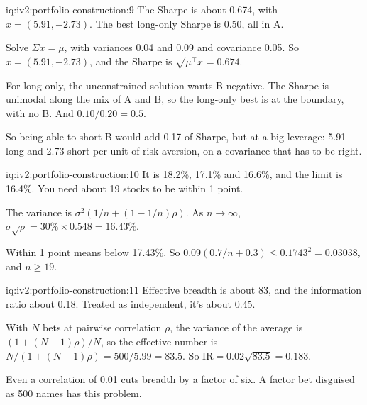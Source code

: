 \begin{solution}{iq:iv2:portfolio-construction:9}
The Sharpe is about 0.674, with $x = (5.91, -2.73)$. The best long-only Sharpe is 0.50, all in A.

Solve $\Sigma x = \mu$, with variances 0.04 and 0.09 and covariance 0.05. So $x = (5.91, -2.73)$, and the Sharpe is $\sqrt{\mu^\top x} = 0.674$.

For long-only, the unconstrained solution wants B negative. The Sharpe is unimodal along the mix of A and B, so the long-only best is at the boundary, with no B. And $0.10/0.20 = 0.5$.

So being able to short B would add 0.17 of Sharpe, but at a big leverage: 5.91 long and 2.73 short per unit of risk aversion, on a covariance that has to be right.

\end{solution}

\begin{solution}{iq:iv2:portfolio-construction:10}
It is 18.2\%, 17.1\% and 16.6\%, and the limit is 16.4\%. You need about 19 stocks to be within 1 point.

The variance is $\sigma^2(1/n + (1 - 1/n)\rho)$. As $n \to \infty$, $\sigma\sqrt{\rho} = 30\% \times 0.548 = 16.43\%$.

Within 1 point means below 17.43\%. So $0.09(0.7/n + 0.3) \le 0.1743^2 = 0.03038$, and $n \ge 19$.

\end{solution}

\begin{solution}{iq:iv2:portfolio-construction:11}
Effective breadth is about 83, and the information ratio about 0.18. Treated as independent, it's about 0.45.

With $N$ bets at pairwise correlation $\rho$, the variance of the average is $(1 + (N - 1)\rho)/N$, so the effective number is $N/(1 + (N - 1)\rho) = 500/5.99 = 83.5$. So $\mathrm{IR} = 0.02\sqrt{83.5} = 0.183$.

Even a correlation of 0.01 cuts breadth by a factor of six. A factor bet disguised as 500 names has this problem.

\end{solution}

